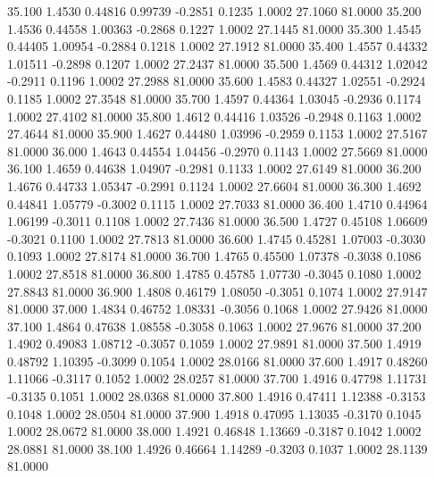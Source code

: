   35.100   1.4530   0.44816   0.99739  -0.2851   0.1235   1.0002  27.1060  81.0000
  35.200   1.4536   0.44558   1.00363  -0.2868   0.1227   1.0002  27.1445  81.0000
  35.300   1.4545   0.44405   1.00954  -0.2884   0.1218   1.0002  27.1912  81.0000
  35.400   1.4557   0.44332   1.01511  -0.2898   0.1207   1.0002  27.2437  81.0000
  35.500   1.4569   0.44312   1.02042  -0.2911   0.1196   1.0002  27.2988  81.0000
  35.600   1.4583   0.44327   1.02551  -0.2924   0.1185   1.0002  27.3548  81.0000
  35.700   1.4597   0.44364   1.03045  -0.2936   0.1174   1.0002  27.4102  81.0000
  35.800   1.4612   0.44416   1.03526  -0.2948   0.1163   1.0002  27.4644  81.0000
  35.900   1.4627   0.44480   1.03996  -0.2959   0.1153   1.0002  27.5167  81.0000
  36.000   1.4643   0.44554   1.04456  -0.2970   0.1143   1.0002  27.5669  81.0000
  36.100   1.4659   0.44638   1.04907  -0.2981   0.1133   1.0002  27.6149  81.0000
  36.200   1.4676   0.44733   1.05347  -0.2991   0.1124   1.0002  27.6604  81.0000
  36.300   1.4692   0.44841   1.05779  -0.3002   0.1115   1.0002  27.7033  81.0000
  36.400   1.4710   0.44964   1.06199  -0.3011   0.1108   1.0002  27.7436  81.0000
  36.500   1.4727   0.45108   1.06609  -0.3021   0.1100   1.0002  27.7813  81.0000
  36.600   1.4745   0.45281   1.07003  -0.3030   0.1093   1.0002  27.8174  81.0000
  36.700   1.4765   0.45500   1.07378  -0.3038   0.1086   1.0002  27.8518  81.0000
  36.800   1.4785   0.45785   1.07730  -0.3045   0.1080   1.0002  27.8843  81.0000
  36.900   1.4808   0.46179   1.08050  -0.3051   0.1074   1.0002  27.9147  81.0000
  37.000   1.4834   0.46752   1.08331  -0.3056   0.1068   1.0002  27.9426  81.0000
  37.100   1.4864   0.47638   1.08558  -0.3058   0.1063   1.0002  27.9676  81.0000
  37.200   1.4902   0.49083   1.08712  -0.3057   0.1059   1.0002  27.9891  81.0000
  37.500   1.4919   0.48792   1.10395  -0.3099   0.1054   1.0002  28.0166  81.0000
  37.600   1.4917   0.48260   1.11066  -0.3117   0.1052   1.0002  28.0257  81.0000
  37.700   1.4916   0.47798   1.11731  -0.3135   0.1051   1.0002  28.0368  81.0000
  37.800   1.4916   0.47411   1.12388  -0.3153   0.1048   1.0002  28.0504  81.0000
  37.900   1.4918   0.47095   1.13035  -0.3170   0.1045   1.0002  28.0672  81.0000
  38.000   1.4921   0.46848   1.13669  -0.3187   0.1042   1.0002  28.0881  81.0000
  38.100   1.4926   0.46664   1.14289  -0.3203   0.1037   1.0002  28.1139  81.0000
